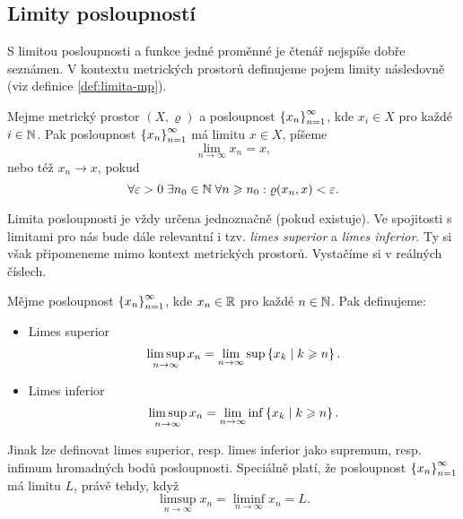 \subsection{Limity posloupností}\label{subsec:limity-posl-mp}

S limitou posloupnosti a funkce jedné proměnné je čtenář nejspíše dobře seznámen. V kontextu metrických prostorů definujeme pojem limity následovně (viz definice \ref{def:limita-mp}).
\begin{definition}\label{def:limita-mp}
    Mejme metrický prostor $(X,\varrho)$ a posloupnost $\left\{x_n\right\}_{n=1}^\infty$, kde $x_i\in X$ pro každé $i\in\mathbb{N}$. Pak posloupnost $\left\{x_n\right\}_{n=1}^\infty$ má limitu $x\in X$, píšeme
    \[\lim_{n\to\infty}x_n=x,\]
    nebo též $x_n\to x$, pokud
    \[\forall\varepsilon>0\;\exists n_0\in\mathbb{N}\;\forall n\geqslant n_0: \varrho(x_n,x)<\varepsilon.\]
\end{definition}
Limita posloupnosti je vždy určena jednoznačně (pokud existuje). Ve spojitosti s limitami pro nás bude dále relevantní i tzv. \emph{limes superior} a \emph{limes inferior}. Ty si však připomeneme mimo kontext metrických prostorů. Vystačíme si v reálných číslech.
\begin{definition}\label{def:limsup-liminf-mp}
    Mějme posloupnost $\left\{x_n\right\}_{n=1}^\infty$, kde $x_n\in\mathbb{R}$ pro každé $n\in\mathbb{N}$. Pak definujeme:
    \begin{itemize}
        \item Limes superior
        \[\limsup_{n\to\infty}x_n=\lim_{n\to\infty}\sup\left\{x_k\mid k\geqslant n\right\}.\]
        \item Limes inferior
        \[\limsup_{n\to\infty}x_n=\lim_{n\to\infty}\inf\left\{x_k\mid k\geqslant n\right\}.\]
    \end{itemize}
\end{definition}
Jinak lze definovat limes superior, resp. limes inferior jako supremum, resp. infimum hromadných bodů posloupnosti. Speciálně platí, že posloupnost $\left\{x_n\right\}_{n=1}^\infty$ má limitu $L$, právě tehdy, když
\[\limsup_{n\to\infty}x_n=\liminf_{n\to\infty}x_n=L.\]

